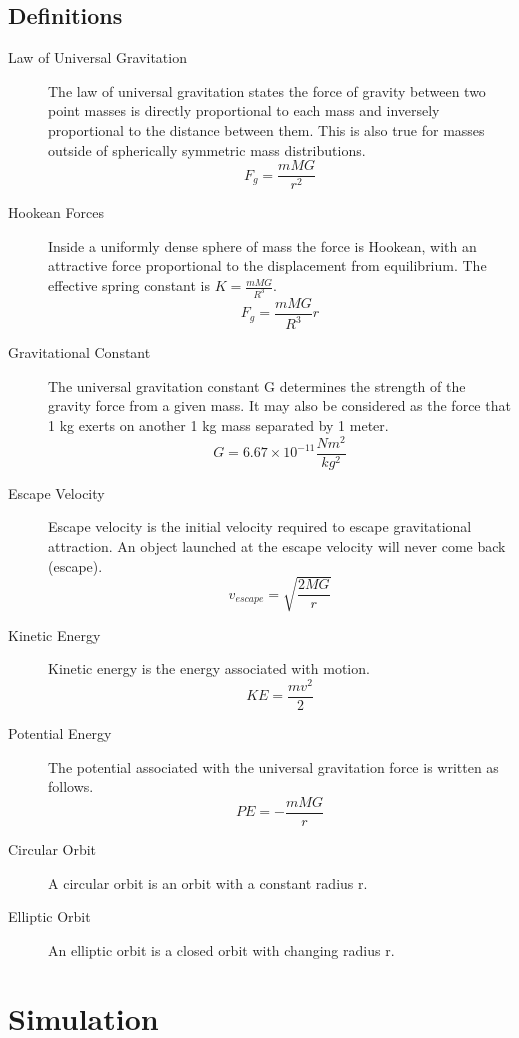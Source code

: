 \documentclass{article}
\begin{document}
\subsection{Definitions}
\label{definitions}
\begin{description}
\item[Law of Universal Gravitation]
The law of universal gravitation states the force of gravity between two point masses is directly proportional to each mass and inversely proportional to the distance between them.  This is also true for masses outside of spherically symmetric mass distributions.
$$ F_g=\frac{mMG}{r^2}$$
\item[Hookean Forces]
Inside a uniformly dense sphere of mass the force is Hookean, with an attractive force proportional to the displacement from equilibrium.  The effective spring constant is $K=\frac{mMG}{R^3}$.
$$ F_g=\frac{mMG}{R^3}r$$
\item[Gravitational Constant]
The universal gravitation constant G determines the strength of the gravity force from a given mass.  It may also be considered as the force that 1 kg exerts on another 1 kg mass separated by 1 meter.\\
$$G=6.67\times 10^{-11}\frac{Nm^2}{kg^2}$$
\item[Escape Velocity]
Escape velocity is the initial velocity required to escape gravitational attraction.  An object launched at the escape velocity will never come back (escape).\\
$$v_{escape}=\sqrt{\frac{2MG}{r}}$$
\item[Kinetic Energy]
Kinetic energy is the energy associated with motion.  \\
$$KE=\frac{mv^2}{2}$$
\item[Potential Energy]
The potential associated with the universal gravitation force is written as follows.  \\
$$PE=-\frac{mMG}{r}$$
\item[Circular Orbit]
A circular orbit is an orbit with a constant radius r.
\item[Elliptic Orbit]
An elliptic orbit is a closed orbit with changing radius r.
\end{description} 
 

\section{Simulation}
\end{document}
